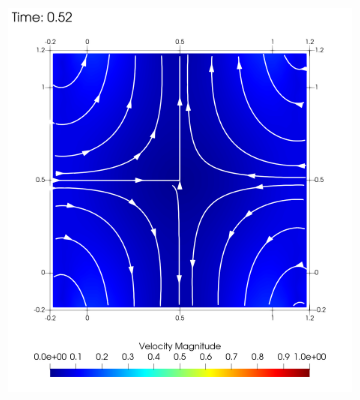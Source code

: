 \begin{figure}
\begin{centering}
\begin{subfigure}{0.45\textwidth}
\begin{centering}
                            \includegraphics[width=\textwidth]{diagrams/results-contractions/mm_5_white.0052.png}
                            \caption{}
                            \label{fig:square-solid-wall-flow:52}
                        \end{centering}
                    \end{subfigure}
                    \begin{subfigure}{0.45\textwidth}
                        \begin{centering}

\end{centering}
\end{subfigure}
\end{centering}
\end{figure}

